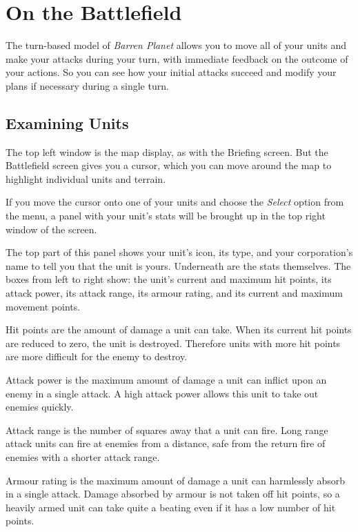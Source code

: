 %
%
%

\chapter{On the Battlefield}

\noindent
The turn-based model of {\it Barren Planet} allows you to move all of your units and make your attacks during your turn, with immediate feedback on the outcome of your actions. So you can see how your initial attacks succeed and modify your plans if necessary during a single turn.

\section{Examining Units}

\noindent
The top left window is the map display, as with the Briefing screen. But the Battlefield screen gives you a cursor, which you can move around the map to highlight individual units and terrain.

If you move the cursor onto one of your units and choose the {\it Select} option from the menu, a panel with your unit's stats will be brought up in the top right window of the screen.

The top part of this panel shows your unit's icon, its type, and your corporation's name to tell you that the unit is yours. Underneath are the stats themselves. The boxes from left to right show: the unit's current and maximum hit points, its attack power, its attack range, its armour rating, and its current and maximum movement points.

Hit points are the amount of damage a unit can take. When its current hit points are reduced to zero, the unit is destroyed. Therefore units with more hit points are more difficult for the enemy to destroy.

Attack power is the maximum amount of damage a unit can inflict upon an enemy in a single attack. A high attack power allows this unit to take out enemies quickly.

Attack range is the number of squares away that a unit can fire. Long range attack units can fire at enemies from a distance, safe from the return fire of enemies with a shorter attack range.

Armour rating is the maximum amount of damage a unit can harmlessly absorb in a single attack. Damage absorbed by armour is not taken off hit points, so a heavily armed unit can take quite a beating even if it has a low number of hit points.


